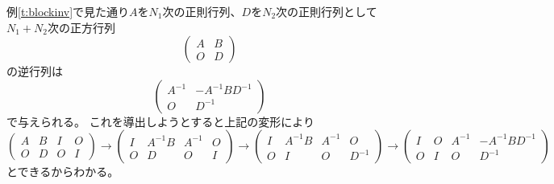\begin{example}
例\ref{t:blockinv}で見た通り$A$を$N_1$次の正則行列、$D$を$N_2$次の正則行列として$N_1+N_2$次の正方行列
$$
\begin{pmatrix}A & B \\ O & D\end{pmatrix}
$$
の逆行列は
$$
\begin{pmatrix}A^{-1} & -A^{-1}B D^{-1} \\ O & D^{-1}\end{pmatrix}
$$
で与えられる。
これを導出しようとすると上記の変形により
$$
\begin{pmatrix}A & B & I & O \\ O & D & O & I\end{pmatrix}
\to \begin{pmatrix}I & A^{-1}B & A^{-1} & O \\ O & D & O & I\end{pmatrix}
\to \begin{pmatrix}I & A^{-1}B & A^{-1} & O \\ O & I & O & D^{-1}\end{pmatrix}
\to \begin{pmatrix}I & O & A^{-1} & -A^{-1}B D^{-1} \\ O & I & O & D^{-1}\end{pmatrix}
$$
とできるからわかる。
\end{example}
